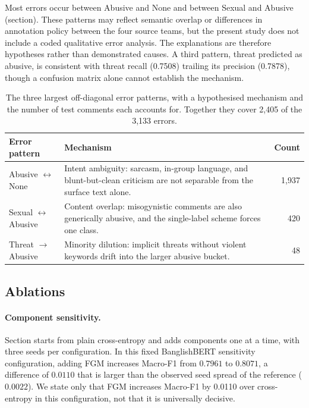 \documentclass[11pt,a4paper]{article}
\def\Cref#1{Section}%
\def\cref#1{section}%
\def\emph#1{#1}%
\begin{document}
Most errors occur between Abusive and None and between Sexual and Abusive (\cref{tab:errorpatterns}). These patterns may reflect semantic overlap or differences in annotation policy between the four source teams, but the present study does not include a coded qualitative error analysis. The explanations are therefore hypotheses rather than demonstrated causes. A third pattern, \emph{threat} predicted as \emph{abusive}, is consistent with \emph{threat} recall (0.7508) trailing its precision (0.7878), though a confusion matrix alone cannot establish the mechanism.

\begin{table}[!htbp]
\centering
\caption{The three largest off-diagonal error patterns, with a hypothesised mechanism and the number of test comments each accounts for. Together they cover 2{,}405 of the 3{,}133 errors.}
\label{tab:errorpatterns}
\small
\begin{tabularx}{\textwidth}{@{}l>{\raggedright\arraybackslash}Xr@{}}
\toprule
\textbf{Error pattern} & \textbf{Mechanism} & \textbf{Count} \\
\midrule
Abusive $\leftrightarrow$ None & Intent ambiguity: sarcasm, in-group language, and blunt-but-clean criticism are not separable from the surface text alone. & 1{,}937 \\
Sexual $\leftrightarrow$ Abusive & Content overlap: misogynistic comments are also generically abusive, and the single-label scheme forces one class. & 420 \\
Threat $\to$ Abusive & Minority dilution: implicit threats without violent keywords drift into the larger \emph{abusive} bucket. & 48 \\
\bottomrule
\end{tabularx}
\end{table}

\subsection{Ablations}
\label{sec:ablation-results}

\paragraph{Component sensitivity.} \Cref{tab:component} starts from plain cross-entropy and adds components one at a time, with three seeds per configuration. In this fixed BanglishBERT sensitivity configuration, adding FGM increases Macro-F1 from $0.7961$ to $0.8071$, a difference of $0.0110$ that is larger than the observed seed spread of the reference ($0.0022$). We state only that FGM increases Macro-F1 by 0.0110 over cross-entropy in this configuration, not that it is universally decisive.
\end{document}
